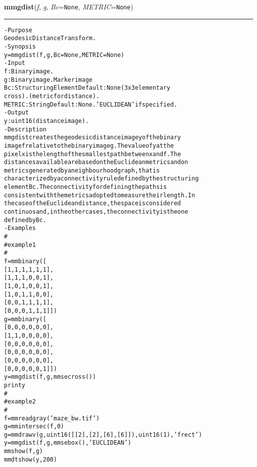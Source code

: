     \begin{boxedminipage}{\textwidth}

    \raggedright \textbf{mmgdist}(\textit{f}, \textit{g}, \textit{Bc}=\texttt{N\-o\-n\-e\-}, \textit{METRIC}=\texttt{N\-o\-n\-e\-})

    \vspace{-1.5ex}

    \rule{\textwidth}{0.5\fboxrule}
\begin{alltt}
- Purpose
    Geodesic Distance Transform.
- Synopsis
    y = mmgdist(f, g, Bc=None, METRIC=None)
- Input
    f:      Binary image.
    g:      Binary image. Marker image
    Bc:     Structuring Element Default: None (3x3 elementary
            cross). (metric for distance).
    METRIC: String Default: None. 'EUCLIDEAN' if specified.
- Output
    y: uint16 (distance image).
- Description
    mmgdist creates the geodesic distance image y of the binary
    image f relative to the binary image g . The value of y at the
    pixel x is the length of the smallest path between x and f . The
    distances available are based on the Euclidean metrics and on
    metrics generated by a neighbourhood graph, that is
    characterized by a connectivity rule defined by the structuring
    element Bc . The connectivity for defining the paths is
    consistent with the metrics adopted to measure their length. In
    the case of the Euclidean distance, the space is considered
    continuos and, in the other cases, the connectivity is the one
    defined by Bc .
- Examples
    \#
    \#   example 1
    \#
    f=mmbinary([
     [1,1,1,1,1,1],
     [1,1,1,0,0,1],
     [1,0,1,0,0,1],
     [1,0,1,1,0,0],
     [0,0,1,1,1,1],
     [0,0,0,1,1,1]])
    g=mmbinary([
     [0,0,0,0,0,0],
     [1,1,0,0,0,0],
     [0,0,0,0,0,0],
     [0,0,0,0,0,0],
     [0,0,0,0,0,0],
     [0,0,0,0,0,1]])
    y=mmgdist(f,g,mmsecross())
    print y
    \#
    \#   example 2
    \#
    f=mmreadgray('maze\_bw.tif')
    g=mmintersec(f,0)
    g=mmdrawv(g,uint16([[2],[2],[6],[6]]),uint16(1),'frect')
    y=mmgdist(f,g,mmsebox(),'EUCLIDEAN')
    mmshow(f,g)
    mmdtshow(y,200)\end{alltt}

    \vspace{1ex}

    \end{boxedminipage}

    \label{multireg:num_pymorph:mmgdtshow}
    \vspace{0.5ex}

